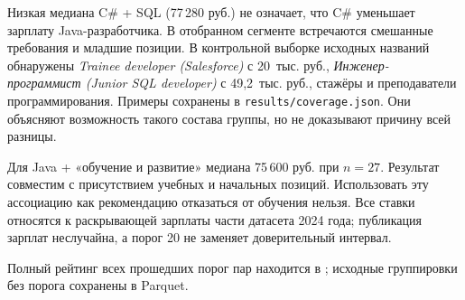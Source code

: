 \documentclass[11pt,a4paper]{article}
\begin{document}
Низкая медиана C\# + SQL (77\,280 руб.) не означает, что C\# уменьшает зарплату Java-разработчика. В отобранном сегменте встречаются смешанные требования и младшие позиции. В контрольной выборке исходных названий обнаружены \emph{Trainee developer (Salesforce)} с 20~тыс. руб., \emph{Инженер-программист (Junior SQL developer)} с 49,2~тыс. руб., стажёры и преподаватели программирования. Примеры сохранены в \texttt{results/coverage.json}. Они объясняют возможность такого состава группы, но не доказывают причину всей разницы.

Для Java + «обучение и развитие» медиана 75\,600 руб. при $n=27$. Результат совместим с присутствием учебных и начальных позиций. Использовать эту ассоциацию как рекомендацию отказаться от обучения нельзя. Все ставки относятся к раскрывающей зарплаты части датасета 2024 года; публикация зарплат неслучайна, а порог 20 не заменяет доверительный интервал.

Полный рейтинг всех прошедших порог пар находится в ; исходные группировки без порога сохранены в Parquet.

\clearpage
\end{document}
